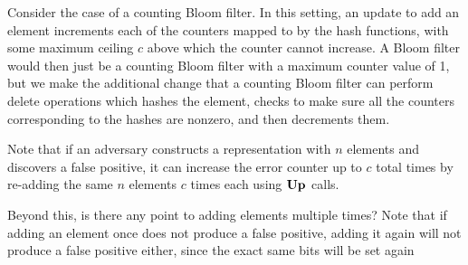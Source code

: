 Consider the case of a counting Bloom filter. In this setting, an update to add an element increments each of the counters mapped to by the hash functions, with some maximum ceiling $c$ above which the counter cannot increase. A Bloom filter would then just be a counting Bloom filter with a maximum counter value of 1, but we make the additional change that a counting Bloom filter can perform delete operations which hashes the element, checks to make sure all the counters corresponding to the hashes are nonzero, and then decrements them.

Note that if an adversary constructs a representation with $n$ elements and discovers a false positive, it can increase the error counter up to $c$ total times by re-adding the same $n$ elements $c$ times each using $\mathbf{Up}\hspace{0.5pt}$ calls.

Beyond this, is there any point to adding elements multiple times? Note that if adding an element once does not produce a false positive, adding it again will not produce a false positive either, since the exact same bits will be set again




